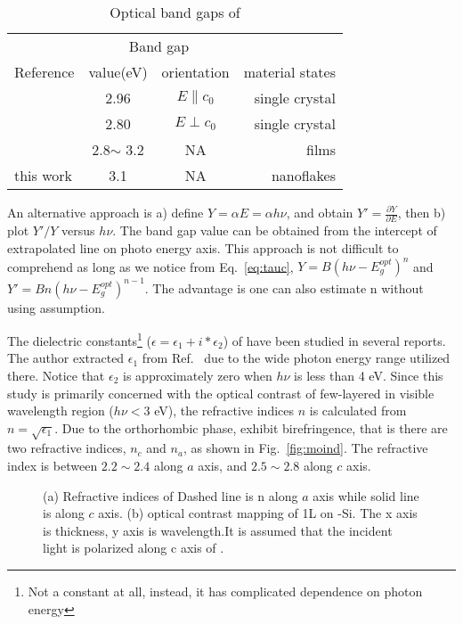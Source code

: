 \begin{table}[htb]
\centering
\caption{Optical band gaps of }\label{tab:mobg}
\begin{tabular}{lccr}
\toprule
&\multicolumn{2}{c}{Band gap} \\
\cmidrule(l){2-3}
Reference & value(eV) & orientation & material states\\
\midrule
\cite{Deb1968}   & 2.96  & $E\parallel c_0$ & single crystal\\
\cite{Deb1968}   & 2.80  & $E\perp c_0$ & single crystal \\
\cite{Julien1995} & 2.8$\sim$ 3.2 & NA & films\\
 this work  & 3.1  & NA & nanoflakes\\
\bottomrule
\end{tabular}
\end{table}

An alternative approach is a) define $Y = \alpha E=\alpha h\nu$, and obtain $Y' = \frac{\partial Y}{\partial E}$, then b) plot $Y'/Y$ versus $h\nu$. The band gap value can be obtained from the intercept of extrapolated line on photo energy axis.\cite{Choopun} This approach is not difficult to comprehend as long as we notice from Eq.~\ref{eq:tauc}, $Y = B (h\nu - E_g^{opt})^n$ and $Y' = B n(h\nu - E_g^{opt})^{n-1}$. The advantage is one can also estimate n without using assumption.

The dielectric constants\footnote{Not a constant at all, instead, it has complicated dependence on photon energy} ($\epsilon = \epsilon_1 + i*\epsilon_2$) of  have been studied in several reports.\cite{Deb1968,Sabhapathi1995,Miyata1996,Abdellaoui1997,Mondragon1999} The author extracted $\epsilon_1$ from Ref.~\cite{Itoh2001a} due to the wide photon energy range utilized there. Notice that $\epsilon_2$ is approximately zero when $h\nu$ is less than 4 eV. Since this study is primarily concerned with the optical contrast of few-layered  in visible wavelength region ($h\nu < 3$ eV), the refractive indices $n$ is calculated from $n = \sqrt{\epsilon_1}$. Due to the orthorhombic phase,  exhibit birefringence, that is there are two refractive indices, $n_c$ and $n_a$, as shown in Fig.~\ref{fig:moind}. The refractive index is between $ 2.2\sim 2.4$ along $a$ axis, and $ 2.5\sim 2.8$ along $c$ axis.

\begin{figure}[htb]
\centering
{}\hspace{0.04\textwidth}
\caption[Refractive indices of ]{(a) Refractive indices of  Dashed line is n along $a$ axis while solid line is along $c$ axis. (b) optical contrast mapping of 1L  on -Si. The x axis is  thickness, y axis is wavelength.It is assumed that the incident light is polarized along c axis of .}
\label{fig:mofl}
\end{figure}

